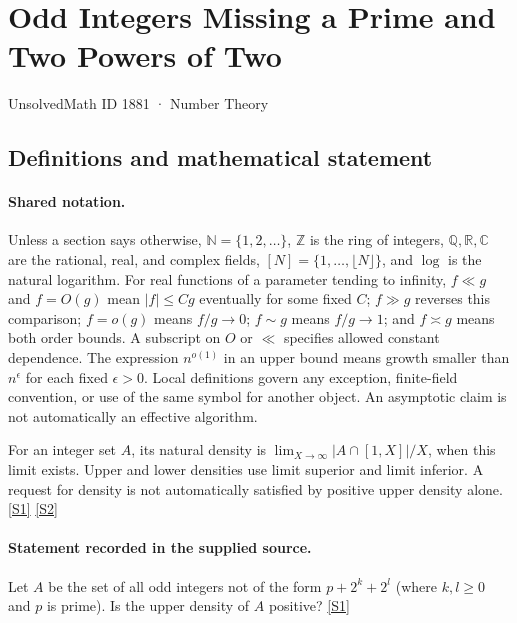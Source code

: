 \documentclass[11pt,a4paper]{article}
\newcommand{\N}{\mathbb{N}}
\newcommand{\Z}{\mathbb{Z}}
\newcommand{\Q}{\mathbb{Q}}
\newcommand{\R}{\mathbb{R}}
\newcommand{\C}{\mathbb{C}}
\newcommand{\sref}[2]{\hyperlink{source:#1:#2}{[S#2]}}
\begin{document}

\setcounter{section}{1880}

\section{Odd Integers Missing a Prime and Two Powers of Two}\label{1881}

{\small\sffamily UnsolvedMath ID 1881 · Number Theory}

\subsection{Definitions and mathematical statement}

\paragraph{Shared notation.}Unless a section says otherwise, $\N=\{1,2,\ldots\}$,
$\Z$ is the ring of integers, $\Q,\R,\C$ are the rational, real, and complex
fields, $[N]=\{1,\ldots,\lfloor N\rfloor\}$, and $\log$ is the natural
logarithm. For real functions of a parameter tending to infinity,
$f\ll g$ and $f=O(g)$ mean $|f|\leq Cg$ eventually for some fixed $C$;
$f\gg g$ reverses this comparison; $f=o(g)$ means $f/g\to0$;
$f\sim g$ means $f/g\to1$; and $f\asymp g$ means both order bounds.
A subscript on $O$ or $\ll$ specifies allowed constant dependence.
The expression $n^{o(1)}$ in an upper bound means growth smaller than
$n^\epsilon$ for each fixed $\epsilon>0$. Local definitions govern any
exception, finite-field convention, or use of the same symbol for another
object. An asymptotic claim is not automatically an effective algorithm.



For an integer set $A$, its natural density is $\lim_{X\to\infty}|A\cap[1,X]|/X$, when this limit exists. Upper and lower densities use limit superior and limit inferior. A request for density is not automatically satisfied by positive upper density alone. \sref{1881}{1} \sref{1881}{2}

\paragraph{Statement recorded in the supplied source.}
Let $A$ be the set of all odd integers not of the form $p+2^{k}+2^l$ (where $k,l\geq 0$ and $p$ is prime). Is the upper density of $A$ positive? \sref{1881}{1}
\end{document}
